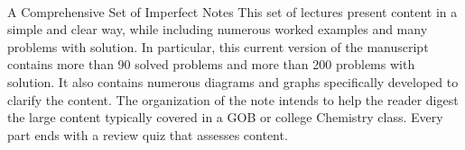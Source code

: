 \documentclass[main.tex]{subfiles}
\begin{document}
\begin{titlepage}

\clearpage\thispagestyle{empty}\mbox{}\clearpage





\vspace{20cm}
\noindent\hspace{-2.6cm}
\vspace{2cm}

\vspace{10cm}
\iftoggle{chem121}{{\fontsize{50}{60}\selectfont \color{blueXIIdark} GOB Chemistry}}{ {\fontsize{50}{60}\selectfont \color{blueXIIdark} College Chemistry}}
\\
\huge\color{blueXIIlight}\noindent \hspace{1cm} A Comprehensive Set of Imperfect Notes
\vfill
\large\color{black}
This set of lectures present content in a simple and clear way, while including numerous worked examples and many problems with solution. In particular, this current version of the manuscript contains more than 90 solved problems and more than 200 problems with solution. It also contains numerous diagrams and graphs specifically developed to clarify the content.
The organization of the note intends to help the reader digest the large content typically covered in a GOB or college Chemistry class. Every part ends with a review quiz that assesses content. 
\thispagestyle{empty}
\end{titlepage}
\end{document}
